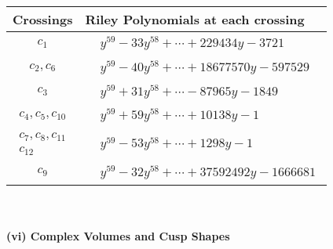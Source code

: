 \documentclass[1p]{elsarticle_modified}
\theoremstyle{definition}
\begin{document}
\begin{tabular}{m{50pt}|m{274pt}}
Crossings & \hspace{64pt}Riley Polynomials at each crossing \\
\hline $$\begin{aligned}c_{1}\end{aligned}$$&$\begin{aligned}
&y^{59}-33 y^{58}+\cdots+229434 y-3721
\end{aligned}$\\
\hline $$\begin{aligned}c_{2},c_{6}\end{aligned}$$&$\begin{aligned}
&y^{59}-40 y^{58}+\cdots+18677570 y-597529
\end{aligned}$\\
\hline $$\begin{aligned}c_{3}\end{aligned}$$&$\begin{aligned}
&y^{59}+31 y^{58}+\cdots-87965 y-1849
\end{aligned}$\\
\hline $$\begin{aligned}c_{4},c_{5},c_{10}\end{aligned}$$&$\begin{aligned}
&y^{59}+59 y^{58}+\cdots+10138 y-1
\end{aligned}$\\
\hline $$\begin{aligned}c_{7},c_{8},c_{11}\\c_{12}\end{aligned}$$&$\begin{aligned}
&y^{59}-53 y^{58}+\cdots+1298 y-1
\end{aligned}$\\
\hline $$\begin{aligned}c_{9}\end{aligned}$$&$\begin{aligned}
&y^{59}-32 y^{58}+\cdots+37592492 y-1666681
\end{aligned}$\\
\hline
\end{tabular}\\~\\
\newpage\flushleft \textbf{(vi) Complex Volumes and Cusp Shapes}
\end{document}
